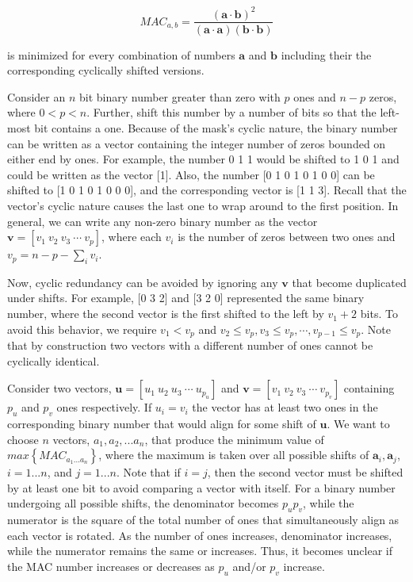 \documentclass[3p,times]{elsarticle}
\begin{document}
\begin{equation}
MAC_{a,b}=\frac{\left(\mathbf{a}\cdot\mathbf{b}\right)^2}{\left(\mathbf{a}\cdot\mathbf{a}\right)\left(\mathbf{b}\cdot\mathbf{b}\right)}
\end{equation}

\noindent is minimized for every combination of numbers $\textbf{a}$ and $\textbf{b}$ including their the corresponding cyclically shifted versions.

Consider an $n$ bit binary number greater than zero with $p$ ones and $n-p$ zeros, where $0<p<n$.  
Further, shift this number by a number of bits so that the left-most bit contains a one.  
Because of the mask's cyclic nature, the binary number can be written as a vector containing the integer number of zeros bounded on either end by ones.  
For example, the number 0 1 1 would be shifted to 1 0 1 and could be written as the vector [1].  
Also, the number [0 1 0 1 0 1 0 0] can be shifted to [1 0 1 0 1 0 0 0], and the corresponding vector is [1 1 3].  
Recall that the vector's cyclic nature causes the last one to wrap around to the first 
position.  
In general, we can write any non-zero binary number as the vector $\textbf{v}=\left[v_1\ v_2\ v_3\ \cdots\ v_p\right]$, where each $v_i$ is the number of zeros between two ones and $v_p=n-p-\sum\limits_{i} v_i$.  

Now, cyclic redundancy can be avoided by ignoring any $\textbf{v}$ that become duplicated under shifts.  
For example, [0 3 2] and [3 2 0] represented the same binary number, where the second vector is the first shifted to the left by $v_1+2$ bits.  
To avoid this behavior, we require $v_{1}<v_p$ and $v_2\le v_p, v_3\le v_p, \cdots, v_{p-1}\le v_p$.  
Note that by construction two vectors with a different number of ones cannot be cyclically identical.

Consider two vectors, $\textbf{u}=\left[u_1\ u_2\ u_3\ \cdots\ u_{p_u}\right]$ and $\textbf{v}=\left[v_1\ v_2\ v_3\ \cdots\ v_{p_v}\right]$ containing $p_u$ and $p_v$ ones respectively.  
If $u_i=v_i$ the vector has at least two ones in the corresponding binary number that would align for some shift of $\textbf{u}$.  
We want to choose $n$ vectors, $a_1, a_2, ... a_n$, that produce the minimum value of $max\left\{MAC_{a_1...a_n}\right\}$, where the maximum is taken over all possible shifts of $\textbf{a}_i, \textbf{a}_j$, $i=1...n$, and $j=1...n$.  
Note that if $i=j$, then the second vector must be shifted by at least one bit to avoid comparing a vector with itself.  
For a binary number undergoing all possible shifts, the denominator becomes $p_u p_v$, while the numerator is the square of the total number of ones that simultaneously align as each vector is rotated.  
As the number of ones increases, denominator increases, while the numerator remains the same or increases.   
Thus, it becomes unclear if the MAC number increases or decreases as $p_u$ and/or $p_v$ increase.
\end{document}
